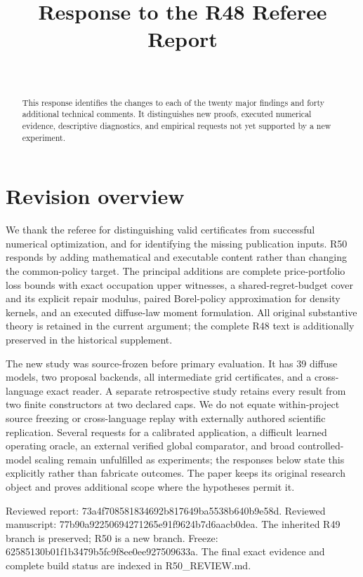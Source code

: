 
\begin{frontmatter}
\title{Response to the R48 Referee Report}
\begin{aug}\author[id=au1,addressref={add1}]{~}\address[id=add1]{}\end{aug}
\begin{abstract}This response identifies the changes to each of the twenty major findings and forty additional technical comments. It distinguishes new proofs, executed numerical evidence, descriptive diagnostics, and empirical requests not yet supported by a new experiment.\end{abstract}
\end{frontmatter}
\section{Revision overview}
We thank the referee for distinguishing valid certificates from successful numerical optimization, and for identifying the missing publication inputs. R50 responds by adding mathematical and executable content rather than changing the common-policy target. The principal additions are complete price-portfolio loss bounds with exact occupation upper witnesses, a shared-regret-budget cover and its explicit repair modulus, paired Borel-policy approximation for density kernels, and an executed diffuse-law moment formulation. All original substantive theory is retained in the current argument; the complete R48 text is additionally preserved in the historical supplement.

The new study was source-frozen before primary evaluation. It has 39 diffuse models, two proposal backends, all intermediate grid certificates, and a cross-language exact reader. A separate retrospective study retains every result from two finite constructors at two declared caps. We do not equate within-project source freezing or cross-language replay with externally authored scientific replication. Several requests for a calibrated application, a difficult learned operating oracle, an external verified global comparator, and broad controlled-model scaling remain unfulfilled as experiments; the responses below state this explicitly rather than fabricate outcomes. The paper keeps its original research object and proves additional scope where the hypotheses permit it.

Reviewed report: 73a4f708581834692b817649ba5538b640b9e58d. Reviewed manuscript: 77b90a92250694271265e91f9624b7d6aacb0dea. The inherited R49 branch is preserved; R50 is a new branch. Freeze: 62585130b01f1b3479b5fc9f8ee0ee927509633a. The final exact evidence and complete build status are indexed in R50\_REVIEW.md.
